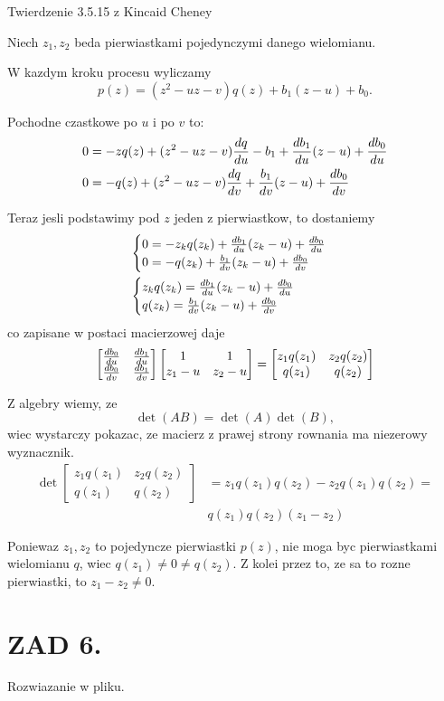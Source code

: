 \documentclass{article}[16pt]
\begin{document}
    Twierdzenie 3.5.15 z Kincaid Cheney
    \medskip

    Niech $z_1,z_2$ beda pierwiastkami pojedynczymi danego wielomianu.
    \medskip

    W kazdym kroku procesu wyliczamy
    $$p(z)=(z^2-uz-v)q(z)+b_1(z-u)+b_0.$$
    
    Pochodne czastkowe po $u$ i po $v$ to:
    \begin{align*}
        0&=-zq(z)+(z^2-uz-v){dq\over du}-b_1+{db_1\over du}(z-u)+{db_0\over du}\\
        0&=-q(z)+(z^2-uz-v){dq\over dv}+{b_1\over dv}(z-u)+{db_0\over dv}
    \end{align*}

    Teraz jesli podstawimy pod $z$ jeden z pierwiastkow, to dostaniemy
    \begin{align*}
        &\begin{cases}
            0=-z_kq(z_k)+{db_1\over du}(z_k-u)+{db_0\over du}\\
            0=-q(z_k)+{b_1\over dv}(z_k-u)+{db_0\over dv}
        \end{cases}\\
        &\begin{cases}
            z_kq(z_k)={db_1\over du}(z_k-u)+{db_0\over du}\\
            q(z_k)={b_1\over dv}(z_k-u)+{db_0\over dv}
        \end{cases}
    \end{align*}
    co zapisane w postaci macierzowej daje
    \begin{align*}
        \begin{bmatrix}
            {db_0\over du} & {db_1\over du}\\
            {db_0\over dv} & {db_1\over dv}
        \end{bmatrix}
        \begin{bmatrix}
            1 & 1\\
            z_1-u & z_2 - u
        \end{bmatrix}=
        \begin{bmatrix}
            z_1q(z_1) & z_2q(z_2)\\
            q(z_1) & q(z_2)
        \end{bmatrix}
    \end{align*}

    Z algebry wiemy, ze
    $$\det(AB)=\det(A)\det(B),$$
    wiec wystarczy pokazac, ze macierz z prawej strony rownania ma niezerowy wyznacznik.
    \begin{align*}
        \det\begin{bmatrix}
            z_1q(z_1) & z_2q(z_2)\\
            q(z_1) & q(z_2)
        \end{bmatrix}&=z_1q(z_1)q(z_2)-z_2q(z_1)q(z_2)=\\
        &q(z_1)q(z_2)(z_1-z_2)
    \end{align*}

    Poniewaz $z_1,z_2$ to pojedyncze pierwiastki $p(z)$, nie moga byc pierwiastkami wielomianu $q$, wiec $q(z_1)\neq0\neq q(z_2)$. Z kolei przez to, ze sa to rozne pierwiastki, to $z_1-z_2\neq0$.


    \section*{ZAD 6.}

    Rozwiazanie w pliku.
\end{document}
